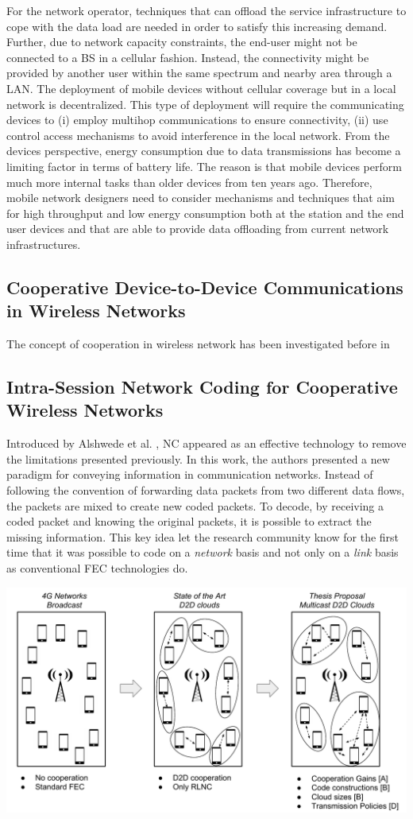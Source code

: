 For the network operator, techniques that can offload the service infrastructure to cope with the data load are needed in order to satisfy this increasing demand. Further, due to network capacity constraints, the end-user might not be connected to a \ac{BS} in a cellular fashion. Instead, the connectivity might be provided by another user within the same spectrum and nearby area through a \ac{LAN}. The deployment of mobile devices without cellular coverage but in a local network is decentralized. This type of deployment will require the communicating devices to (i) employ multihop communications to ensure connectivity, (ii) use control access mechanisms to avoid interference in the local network. From the devices perspective, energy consumption due to data transmissions has become a limiting factor in terms of battery life. The reason is that mobile devices perform much more internal tasks than older devices from ten years ago. Therefore, mobile network designers need to consider mechanisms and techniques that aim for high throughput and low energy consumption both at the station and the end user devices and that are able to provide data offloading from current network infrastructures.

\subsection{Cooperative Device-to-Device Communications in Wireless Networks}

The concept of cooperation in wireless network has been investigated before in \cite{fitzek2006cooperation,fitzek2013mobile}

\subsection{Intra-Session Network Coding for Cooperative Wireless Networks}
Introduced by Alshwede et al. \cite{ahlswede2000network}, \ac{NC} appeared as an effective technology to remove the limitations presented previously. In this work, the authors presented a new paradigm for conveying information in communication networks. Instead of following the convention of forwarding data packets from two different data flows, the packets are mixed to create new coded packets. To decode, by receiving a coded packet and knowing the original packets, it is possible to extract the missing information. This key idea let the research community know for the first time that it was possible to code on a \textit{network} basis and not only on a \textit{link} basis as conventional \ac{FEC} technologies do.


\includegraphics[width=\textwidth]{introduction/figures/thesis-diagrams.pdf}